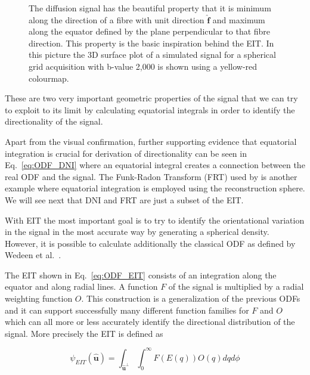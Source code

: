 \documentclass{bioinfo}
\begin{document}
\begin{methods}
\begin{figure}
\caption{The diffusion signal has the beautiful property that it is minimum
along the direction of a fibre with unit direction $\mathbf{\hat{\bm{f}}}$
and maximum along the equator defined by the plane perpendicular to
that fibre direction. This property is the basic inspiration behind
the EIT. In this picture the 3D surface plot of a simulated signal
for a spherical grid acquisition with b-value 2,000 is shown using
a yellow-red colourmap.}


\label{Flo:single_fibre_spherical_grid}
\end{figure}


These are two very important geometric properties of the signal that
we can try to exploit to its limit by calculating equatorial integrals
in order to identify the directionality of the signal. 

Apart from the visual confirmation, further supporting evidence that
equatorial integration is crucial for derivation of directionality
can be seen in Eq.~\ref{eq:ODF_DNI} where an equatorial integral
creates a connection between the real ODF and the signal. The Funk-Radon
Transform (FRT) used by \cite{Tuch2004} is another example where
equatorial integration is employed using the reconstruction sphere.
We will see next that DNI and FRT are just a subset of the EIT.

With EIT the most important goal is to try to identify the orientational
variation in the signal in the most accurate way by generating a spherical
density. However, it is possible to calculate additionally the classical
ODF as defined by Wedeen et al.~\cite{Wedeen}.

The EIT shown in Eq.~\ref{eq:ODF_EIT} consists of an integration
along the equator and along radial lines. A function $F$ of the signal
is multiplied by a radial weighting function $O$. This construction
is a generalization of the previous ODFs and it can support successfully
many different function families for $F$ and $O$ which can all more
or less accurately identify the directional distribution of the signal.
More precisely the EIT is defined as

%
\begin{equation}
\psi_{EIT}(\hat{\mathbf{u}})=\int_{\hat{\mathbf{u}}^{\perp}}\int_{0}^{\infty}F(E(q))O(q)dqd\phi\label{eq:ODF_EIT}\end{equation}



\end{methods}
\end{document}
